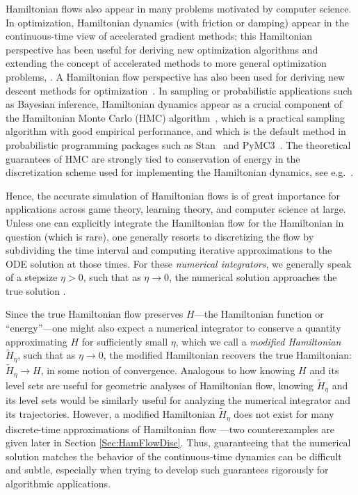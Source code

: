 \documentclass[11pt]{article}
\begin{document}
Hamiltonian flows also appear in many problems motivated by computer science. In optimization, Hamiltonian dynamics (with friction or damping) appear in the continuous-time view of accelerated gradient methods; this Hamiltonian perspective has been useful for deriving new optimization algorithms and extending the concept of accelerated methods to more general optimization problems, \citep[see, e.g.,][]{su2016differential, wibisono2016variational, betancourt2018symplectic,wilson2019accelerating, diakonikolas2021generalized, wilson2021lyapunov, duruisseaux2022accelerated}. A Hamiltonian flow perspective has also been used for deriving new descent methods for optimization~\citep{o2019hamiltonian, teel2019first, de2023improving, wang2024hamiltonian}. In sampling or probabilistic applications such as Bayesian inference, Hamiltonian dynamics appear as a crucial component of the Hamiltonian Monte Carlo (HMC) algorithm~\citep{Duane87,neal2011mcmc}, which is a practical sampling algorithm with good empirical performance, and which is the default method in probabilistic programming packages such as Stan~\citep{carpenter2017stan} and PyMC3~\citep{salvatier2016probabilistic}.
The theoretical guarantees of HMC are strongly tied to conservation of energy in the discretization scheme used for implementing the Hamiltonian dynamics, see e.g.~\cite{HG14, Betancourt16, bou2018geometric, MV18, lee2018convergence, CV19, betancourt2019convergence, CDWY20, lee2020logsmooth, kook2022sampling}.

Hence, the accurate simulation of Hamiltonian flows is of great importance for applications across game theory, learning theory, and computer science at large. Unless one can explicitly integrate the Hamiltonian flow for the Hamiltonian in question (which is rare), one generally resorts to discretizing the flow by subdividing the time interval and computing iterative approximations to the ODE solution at those times. For these \textit{numerical integrators}, we generally speak of a stepsize $\eta>0$, such that as $\eta\rightarrow 0$, the numerical solution approaches the true solution \citep{Atkinson}. 

Since the true Hamiltonian flow preserves $H$---the Hamiltonian function or ``energy''---one might also expect a numerical integrator to conserve a quantity approximating $H$ for sufficiently small $\eta$, which we call a \textit{modified Hamiltonian} $\widetilde{H}_{\eta}$, such that as $\eta \to 0$, the modified Hamiltonian recovers the true Hamiltonian: $\widetilde{H}_{\eta} \to H$, in some notion of convergence. Analogous to how knowing $H$ and its level sets are useful for geometric analyses of Hamiltonian flow, knowing $\widetilde{H}_{\eta}$ and its level sets would be similarly useful for analyzing the numerical integrator and its trajectories. However, a modified Hamiltonian $\widetilde{H}_{\eta}$ does not exist for many discrete-time approximations of Hamiltonian flow \citep[Chapter IX]{Hairer2006}---two counterexamples are given later in Section \ref{Sec:HamFlowDisc}. Thus, guaranteeing that the numerical solution matches the behavior of the continuous-time dynamics can be difficult and subtle, especially when trying to develop such guarantees rigorously for algorithmic applications.
\end{document}
